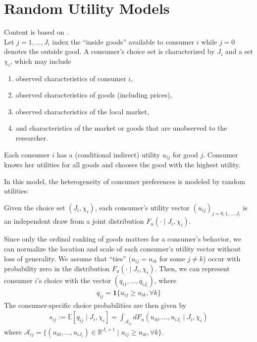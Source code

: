 \documentclass[11pt]{elegantbook}
\begin{document}
\section{Random Utility Models}
Content is based on \cite{berry2021foundations}.\\
Let $j=1,...,J_i$ index the ``inside goods'' available to consumer $i$ while $j=0$ denotes the outside good. A consumer's choice set is characterized by $J_i$ and a set $\chi_i$, which may include
\begin{enumerate}[$\circ$]
    \item observed characteristics of consumer $i$,
    \item observed characteristics of goods (including prices),
    \item observed characteristics of the local market,
    \item and characteristics of the market or goods that are unobserved to the researcher.
\end{enumerate}
Each consumer $i$ has a (conditional indirect) utility $u_{ij}$ for good $j$. Consumer knows her utilities for all goods and chooses the good with the highest utility.

In this model, the heterogeneity of consumer preferences is modeled by random utilities:
\begin{definition}
    Given the choice set $(J_i, \chi_i)$, each consumer's utility vector $(u_{ij})_{j=0,1,...,J_i}$ is an independent draw from a joint distribution $F_u(\cdot\mid J_i, \chi_i)$.
\end{definition}
Since only the ordinal ranking of goods matters for a consumer's behavior, we can normalize the location and scale of each consumer's utility vector without loss of generality. We assume that ``ties'' ($u_{ij}=u_{ik}$ for some $j\neq k$) occur with probability zero in the distribution $F_u(\cdot\mid J_i, \chi_i)$. Then, we can represent consumer $i$'s choice with the vector $(q_{i1},...,q_{iJ_i})$, where
\begin{equation}
    \begin{aligned}
        q_{ij}=\mathbf{1}\{u_{ij}\geq u_{ik},\forall k\}
    \end{aligned}
    \nonumber
\end{equation}
The consumer-specific choice probabilities are then given by
\begin{equation}
    \begin{aligned}
        s_{ij}:=\mathbb{E}[q_{ij}\mid J_i,\chi_i]=\int_{\mathcal{A}_{ij}}d F_u\left(u_{i0},...,u_{iJ_i}\mid J_i, \chi_i\right)
    \end{aligned}
    \nonumber
\end{equation}
where $\mathcal{A}_{ij}=\{(u_{i0},...,u_{iJ_i})\in\mathbb{R}^{J_i+1}\mid u_{ij}\geq u_{ik},\forall k\}$.
\end{document}
